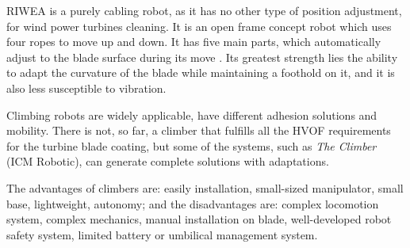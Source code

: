 RIWEA is a purely cabling robot, as it has no other type of position
adjustment, for wind power turbines cleaning. It is an open frame concept robot
which uses four ropes to move up and down. It has five main parts, which
automatically adjust to the blade surface during its move
\citep{jeon2012maintenance}. Its greatest strength lies the ability to adapt the
curvature of the blade while maintaining a foothold on it, and it is also less
susceptible to vibration.

Climbing robots are widely applicable, have different adhesion solutions and
mobility. There is not, so far, a climber that fulfills all the HVOF
requirements for the turbine blade coating, but some of the systems, such as
\textit{The Climber} (ICM Robotic), can generate complete solutions with
adaptations.

The advantages of climbers are: easily installation, small-sized
manipulator, small base, lightweight, autonomy; and the disadvantages are:
complex locomotion system, complex mechanics, manual installation on blade,
well-developed robot safety system, limited battery or umbilical management
system. 
